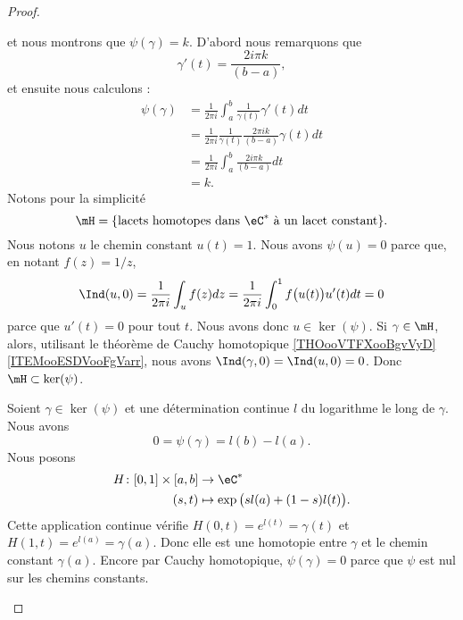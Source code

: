 \begin{proof}
\begin{subproof}
        et nous montrons que \( \psi(\gamma)=k\). D'abord nous remarquons que
        \begin{equation}
            \gamma'(t)=\frac{ 2i\pi k }{ (b-a) },
        \end{equation}
        et ensuite nous calculons :
        \begin{subequations}
            \begin{align}
                \psi(\gamma)&=\frac{1}{ 2\pi i }\int_a^b\frac{1}{ \gamma(t) }\gamma'(t)dt\\
                &=\frac{1}{ 2\pi i }\frac{1}{ \gamma(t) }\frac{ 2\pi ik }{ (b-a) }\gamma(t)dt\\
                &=\frac{1}{ 2\pi i }\int_a^b\frac{ 2i\pi k }{ (b-a) }dt\\
                &=k.
            \end{align}
        \end{subequations}
        \spitem[Noyau]
        Notons pour la simplicité
        \begin{equation}
            \mH=\{ \text{lacets homotopes dans \( \eC^*\) à un lacet constant} \}.
        \end{equation}
        Nous notons \( u\) le chemin constant \( u(t)=1\). Nous avons \( \psi(u)=0\) parce que, en notant \( f(z)=1/z\),
        \begin{equation}
            \Ind(u,0)=\frac{1}{ 2\pi i }\int_uf(z)dz=\frac{1}{ 2\pi i }\int_0^1f\big( u(t) \big)u'(t)dt=0
        \end{equation}
        parce que \( u'(t)=0\) pour tout \( t\). Nous avons donc \( u\in\ker(\psi)\). Si \( \gamma\in\mH\), alors, utilisant le théorème de Cauchy homotopique \ref{THOooVTFXooBgvVyD}\ref{ITEMooESDVooFgVarr}, nous avons \( \Ind(\gamma,0)=\Ind(u,0)=0\). Donc \( \mH\subset\ker(\psi)\).

        Soient \( \gamma\in\ker(\psi)\) et une détermination continue \( l\) du logarithme le long de \( \gamma\). Nous avons 
        \begin{equation}
            0=\psi(\gamma)=l(b)-l(a).
        \end{equation}
        Nous posons
        \begin{equation}
            \begin{aligned}
                H\colon \mathopen[ 0 , 1 \mathclose]\times \mathopen[ a , b \mathclose]&\to \eC^* \\
                (s,t)&\mapsto  \exp\big( sl(a)+(1-s)l(t) \big).
            \end{aligned}
        \end{equation}
        Cette application continue vérifie \( H(0,t)= e^{l(t)}=\gamma(t)\) et \( H(1,t)= e^{l(a)}=\gamma(a)\). Donc elle est une homotopie entre \( \gamma\) et le chemin constant \( \gamma(a)\). Encore par Cauchy homotopique, \( \psi(\gamma)=0\) parce que \( \psi\) est nul sur les chemins constants.
        \end{subproof}
\end{proof}

